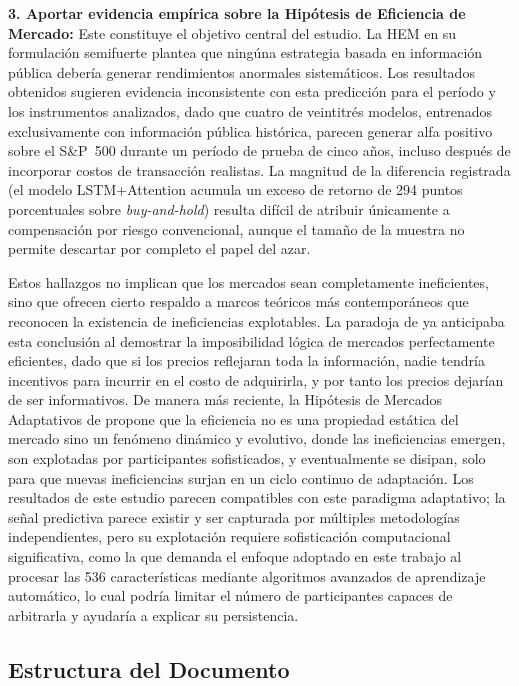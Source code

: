 ﻿\documentclass[11pt,a4paper]{article}
\begin{document}
\textbf{3. Aportar evidencia emp\'irica sobre la Hip\'otesis de Eficiencia de Mercado:} Este constituye el objetivo central del estudio. La HEM en su formulaci\'on semifuerte \citep{fama1970} plantea que ning\'una estrategia basada en informaci\'on p\'ublica deber\'ia generar rendimientos anormales sistem\'aticos. Los resultados obtenidos sugieren evidencia inconsistente con esta predicci\'on para el per\'iodo y los instrumentos analizados, dado que cuatro de veintitr\'es modelos, entrenados exclusivamente con informaci\'on p\'ublica hist\'orica, parecen generar alfa positivo sobre el S\&P~500 durante un per\'iodo de prueba de cinco a\~nos, incluso despu\'es de incorporar costos de transacci\'on realistas. La magnitud de la diferencia registrada (el modelo LSTM+Attention acumula un exceso de retorno de 294 puntos porcentuales sobre \textit{buy-and-hold}) resulta dif\'icil de atribuir \'unicamente a compensaci\'on por riesgo convencional, aunque el tama\~no de la muestra no permite descartar por completo el papel del azar.

Estos hallazgos no implican que los mercados sean completamente ineficientes, sino que ofrecen cierto respaldo a marcos te\'oricos m\'as contempor\'aneos que reconocen la existencia de ineficiencias explotables. La paradoja de \citet{grossman1980} ya anticipaba esta conclusi\'on al demostrar la imposibilidad l\'ogica de mercados perfectamente eficientes, dado que si los precios reflejaran toda la informaci\'on, nadie tendr\'ia incentivos para incurrir en el costo de adquirirla, y por tanto los precios dejar\'ian de ser informativos. De manera m\'as reciente, la Hip\'otesis de Mercados Adaptativos de \citet{lo2019} propone que la eficiencia no es una propiedad est\'atica del mercado sino un fen\'omeno din\'amico y evolutivo, donde las ineficiencias emergen, son explotadas por participantes sofisticados, y eventualmente se disipan, solo para que nuevas ineficiencias surjan en un ciclo continuo de adaptaci\'on. Los resultados de este estudio parecen compatibles con este paradigma adaptativo; la se\~nal predictiva parece existir y ser capturada por m\'ultiples metodolog\'ias independientes, pero su explotaci\'on requiere sofisticaci\'on computacional significativa, como la que demanda el enfoque adoptado en este trabajo al procesar las 536 caracter\'isticas mediante algoritmos avanzados de aprendizaje autom\'atico, lo cual podr\'ia limitar el n\'umero de participantes capaces de arbitrarla y ayudar\'ia a explicar su persistencia.

\subsection{Estructura del Documento}
\end{document}
